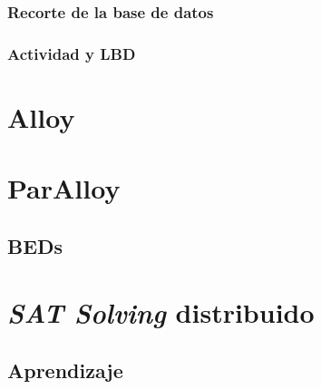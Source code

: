 \subsubsection{Recorte de la base de datos}
\subsubsection{Actividad y LBD}

\section{Alloy}

\section{ParAlloy}
\subsection{BEDs}

\section{\emph{SAT Solving} distribuido}

\subsection{Aprendizaje}